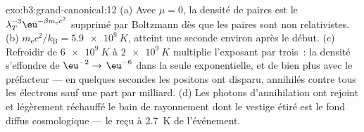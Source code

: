 \begin{solution}{exo:b3:grand-canonical:12}
(a) Avec $\mu = 0$, la densité de paires est le
$\lambda_T^{-3}\eu^{-\beta m_{\text{e}}c^2}$ supprimé par Boltzmann
dès que les paires sont non relativistes. (b) $m_{\text{e}}c^2/k_{\text{B}} =
\qty{5.9e9}{K}$, atteint une seconde environ après le début.
(c) Refroidir de $\qty{6e9}{K}$ à $\qty{2e9}{K}$ multiplie
l'exposant par trois~: la densité s'effondre de $\eu^{-2} \to$
$\eu^{-6}$ dans la seule exponentielle, et de bien plus avec le
préfacteur --- en quelques secondes les positons ont disparu,
annihilés contre tous les électrons sauf une part par milliard. (d)
Les photons d'annihilation ont rejoint et légèrement réchauffé le
bain de rayonnement dont le vestige étiré est le fond diffus
cosmologique --- le reçu à \qty{2.7}{K} de l'événement.
\end{solution}

